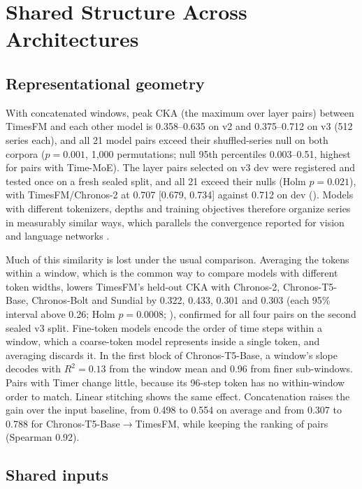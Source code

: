 \section{Shared Structure Across Architectures}
\label{sec:shared}

\subsection{Representational geometry}
\label{sec:geometry}

With concatenated windows, peak CKA (the maximum over layer pairs) between TimesFM and each other model is 0.358--0.635
on v2 and 0.375--0.712 on v3 (512 series each), and all 21 model pairs exceed their shuffled-series null on both corpora
($p=0.001$, 1{,}000 permutations; null 95th percentiles 0.003--0.51, highest for pairs with Time-MoE). The layer pairs
selected on v3 dev were registered and tested once on a fresh sealed split, and all 21 exceed their nulls (Holm $p=0.021$),
with TimesFM/Chronos-2 at 0.707 [0.679, 0.734] against 0.712 on dev (). Models with different
tokenizers, depths and training objectives therefore organize series in measurably similar ways, which parallels the
convergence reported for vision and language networks \citep{huh2024platonic}.

Much of this similarity is lost under the usual comparison. Averaging the tokens within a window, which is the common
way to compare models with different token widths, lowers TimesFM's held-out CKA with Chronos-2, Chronos-T5-Base, Chronos-Bolt and Sundial by
0.322, 0.433, 0.301 and 0.303 (each 95\% interval above 0.26; Holm $p=0.0008$; ), confirmed for all four
pairs on the second sealed v3 split. Fine-token models encode the order of time steps within a
window, which a coarse-token model represents inside a single token, and averaging discards it. In the first block of Chronos-T5-Base, a window's slope decodes with $R^2=0.13$ from the
window mean and 0.96 from finer sub-windows. Pairs with Timer change little, because its 96-step token has no
within-window order to match. Linear stitching shows the same effect. Concatenation raises the gain over the input baseline, from 0.498 to 0.554 on average and from
0.307 to 0.788 for Chronos-T5-Base$\to$TimesFM, while keeping the ranking of pairs (Spearman 0.92).

\subsection{Shared inputs}
\label{sec:inputs}

